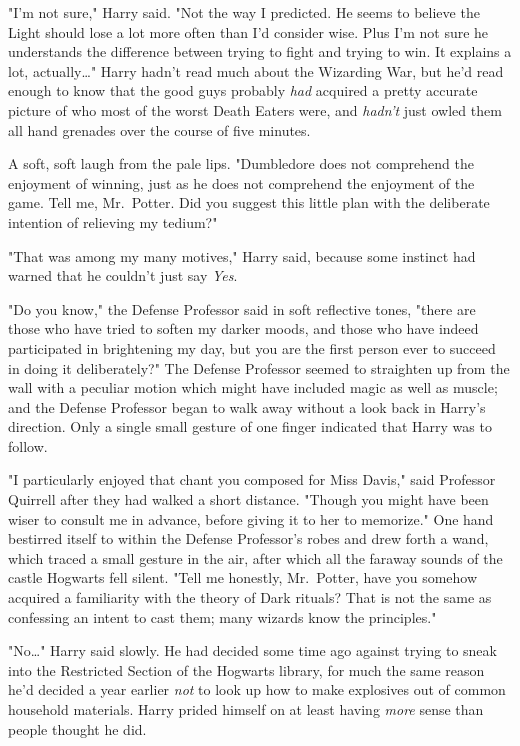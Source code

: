 "I'm not sure," Harry said. "Not the way I predicted. He seems to believe the 
Light should lose a lot more often than I'd consider wise. Plus I'm not sure he 
understands the difference between trying to fight and trying to win. It 
explains a lot, actually{\ldots}" Harry hadn't read much about the Wizarding 
War, but he'd read enough to know that the good guys probably \emph{had} 
acquired a pretty accurate picture of who most of the worst Death Eaters were, 
and \emph{hadn't} just owled them all hand grenades over the course of five 
minutes.

A soft, soft laugh from the pale lips. "Dumbledore does not comprehend the 
enjoyment of winning, just as he does not comprehend the enjoyment of the game. 
Tell me, Mr.~Potter. Did you suggest this little plan with the deliberate 
intention of relieving my tedium?"

"That was among my many motives," Harry said, because some instinct had warned 
that he couldn't just say \emph{Yes}.

"Do you know," the Defense Professor said in soft reflective tones, "there are 
those who have tried to soften my darker moods, and those who have indeed 
participated in brightening my day, but you are the first person ever to 
succeed in doing it deliberately?" The Defense Professor seemed to straighten 
up from the wall with a peculiar motion which might have included magic as well 
as muscle; and the Defense Professor began to walk away without a look back in 
Harry's direction. Only a single small gesture of one finger indicated that 
Harry was to follow.

"I particularly enjoyed that chant you composed for Miss Davis," said Professor 
Quirrell after they had walked a short distance. "Though you might have been 
wiser to consult me in advance, before giving it to her to memorize." One hand 
bestirred itself to within the Defense Professor's robes and drew forth a wand, 
which traced a small gesture in the air, after which all the faraway sounds of 
the castle Hogwarts fell silent. "Tell me honestly, Mr.~Potter, have you 
somehow acquired a familiarity with the theory of Dark rituals? That is not the 
same as confessing an intent to cast them; many wizards know the principles."

"No{\ldots}" Harry said slowly. He had decided some time ago against trying to 
sneak into the Restricted Section of the Hogwarts library, for much the same 
reason he'd decided a year earlier \emph{not} to look up how to make explosives 
out of common household materials. Harry prided himself on at least having 
\emph{more} sense than people thought he did.

